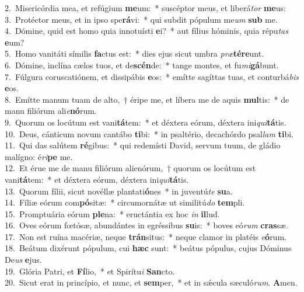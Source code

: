 {2.~}Misericórdia mea, et refúgium \textbf{me}um:~* suscéptor meus, et liberá\textit{tor} \textbf{me}us:\\
{3.~}Protéctor meus, et in ipso spe\textbf{rá}vi:~* qui subdit pópulum me\textit{um} \textbf{sub} me.\\
{4.~}Dómine, quid est homo quia innotuísti \textbf{e}i?~* aut fílius hóminis, quia répu\textit{tas} \textbf{e}um?\\
{5.~}Homo vanitáti símilis \textbf{fa}ctus est:~* dies ejus sicut umbra \textit{præ}\textbf{té}\textbf{re}unt.\\
{6.~}Dómine, inclína cælos tuos, et de\textbf{scén}de:~* tange montes, et fu\textit{mi}\textbf{gá}bunt.\\
{7.~}Fúlgura coruscatiónem, et dissipábis \textbf{e}os:~* emítte sagíttas tuas, et conturbá\textit{bis} \textbf{e}os.\\
{8.~}Emítte manum tuam de alto,~† éripe me, et líbera me de aquis \textbf{mul}tis:~* de manu filiórum ali\textit{e}\textbf{nó}rum.\\
{9.~}Quorum os locútum est vani\textbf{tá}tem:~* et déxtera eórum, déxtera ini\textit{qui}\textbf{tá}tis.\\
{10.~}Deus, cánticum novum cantábo \textbf{ti}bi:~* in psaltério, decachórdo psal\textit{lam} \textbf{ti}bi.\\
{11.~}Qui das salútem \textbf{ré}gibus:~* qui redemísti David, servum tuum, de gládio malígno: é\textit{ri}\textbf{pe} me.\\
{12.~}Et érue me de manu filiórum alienórum,~† quorum os locútum est vani\textbf{tá}tem:~* et déxtera eórum, déxtera ini\textit{qui}\textbf{tá}tis.\\
{13.~}Quorum fílii, sicut novéllæ plantati\textbf{ó}nes~* in juventú\textit{te} \textbf{su}a.\\
{14.~}Fíliæ eórum com\textbf{pó}sitæ:~* circumornátæ ut similitú\textit{do} \textbf{tem}pli.\\
{15.~}Promptuária eórum \textbf{ple}na:~* eructántia ex hoc \textit{in} \textbf{il}lud.\\
{16.~}Oves eórum fœtósæ, abundántes in egréssibus \textbf{su}is:~* boves eó\textit{rum} \textbf{cras}sæ.\\
{17.~}Non est ruína macériæ, neque \textbf{trán}situs:~* neque clamor in platéis \textit{e}\textbf{ó}rum.\\
{18.~}Beátum dixérunt pópulum, cui \textbf{hæc} sunt:~* beátus pópulus, cujus Dóminus De\textit{us} \textbf{e}jus.\\
{19.~}Glória Patri, et \textbf{Fí}lio,~* et Spirítu\textit{i} \textbf{San}cto.\\
{20.~}Sicut erat in princípio, et nunc, et \textbf{sem}per,~* et in sǽcula sæculó\textit{rum}. \textbf{A}men.\\
